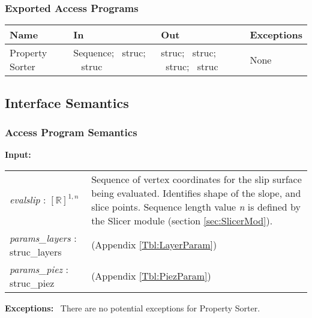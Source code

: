\documentclass[12pt, titlepage]{article}
\begin{document}
\subsubsection{Exported Access Programs}
\begin{center}
\renewcommand*{\arraystretch}{1.5}
\begin{tabular}{| p{} | p{} | 
p{} | p{} |} \hline 

  \textbf{Name} & \textbf{In} & \textbf{Out} & \textbf{Exceptions}
  \\ \hline

  Property Sorter & Sequence; ~\newline struc; ~\newline
  struc & struc; ~\newline struc; ~\newline struc; ~\newline struc &
  None \\ \hline
\end{tabular}
\end{center}

\subsection{Interface Semantics}

\subsubsection{Access Program Semantics}
\textbf{Input:}
\renewcommand*{\arraystretch}{1.5}
\begin{longtable}{p{} p{}}
  \textit{evalslip} : $[\mathbb{R}]^{1,n}$ & Sequence of vertex
  coordinates for the slip surface being evaluated. Identifies shape
  of the slope, and slice points. Sequence length value \textit{n} is
  defined by the Slicer module (section \ref{sec:SlicerMod}).  \\

  \textit{params\_layers} : struc\_layers & (Appendix
  \ref{Tbl:LayerParam}) \\
  
  \textit{params\_piez} : struc\_piez & (Appendix \ref{Tbl:PiezParam})
  \\
\end{longtable}

\noindent \textbf{Exceptions:} ~\newline\noindent There are no
potential exceptions for Property Sorter.
\end{document}
